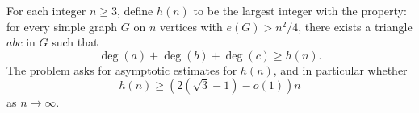 For each integer $n\ge 3$, define $h(n)$ to be the largest integer with the property:
for every simple graph $G$ on $n$ vertices with $e(G) > n^2/4$, there exists a triangle $abc$ in $G$ such that
\[
\deg(a)+\deg(b)+\deg(c) \ge h(n).
\]
The problem asks for asymptotic estimates for $h(n)$, and in particular whether
\[
 h(n) \ge (2(\sqrt{3}-1)-o(1))n
\]
as $n\to\infty$.
